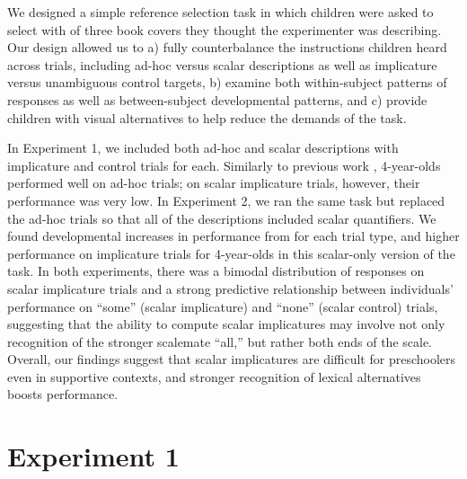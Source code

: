 \documentclass[10pt,letterpaper]{article}
\begin{document}
We designed a simple reference selection task in which children were asked to select with of three book covers they thought the experimenter was describing. Our design allowed us to a) fully counterbalance the instructions children heard across trials, including ad-hoc versus scalar descriptions as well as implicature versus unambiguous control targets, b) examine both within-subject patterns of responses as well as between-subject developmental patterns, and c) provide children with visual alternatives to help reduce the demands of the task.

In Experiment 1, we included both ad-hoc and scalar descriptions with implicature and control trials for each. Similarly to previous work \cite[e.g.,][]{stiller2014}, 4-year-olds performed well on ad-hoc trials; on scalar implicature trials, however, their performance was very low. In Experiment 2, we ran the same task but replaced the ad-hoc trials so that all of the descriptions included scalar quantifiers. We found developmental increases in performance from for each trial type, and higher performance on implicature trials for 4-year-olds in this scalar-only version of the task. In both experiments, there was a bimodal distribution of responses on scalar implicature trials and a strong predictive relationship between individuals' performance on ``some'' (scalar implicature) and ``none'' (scalar control) trials, suggesting that the ability to compute scalar implicatures may involve not only recognition of the stronger scalemate ``all,'' but rather both ends of the scale. Overall, our findings suggest that scalar implicatures are difficult for preschoolers even in supportive contexts, and stronger recognition of lexical alternatives boosts performance. 




\section{Experiment 1} 
\end{document}
